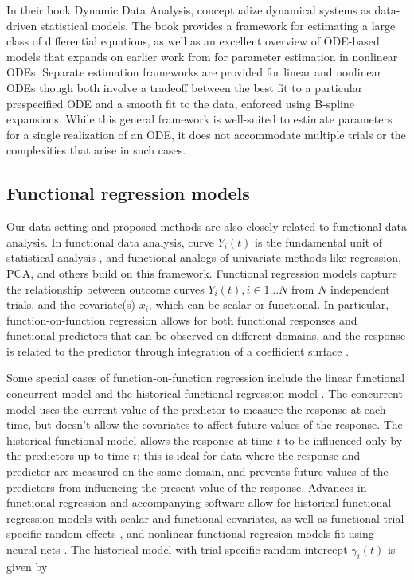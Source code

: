 \documentclass[preprint]{JASA}
\begin{document}
In their book Dynamic Data Analysis, \cite{ramsay2017} conceptualize
dynamical systems as data-driven statistical models. The book provides a
framework for estimating a large class of differential equations, as
well as an excellent overview of ODE-based models that expands on
earlier work from \cite{ramsay2007} for parameter estimation in
nonlinear ODEs. Separate estimation frameworks are provided for linear
and nonlinear ODEs though both involve a tradeoff between the best fit
to a particular prespecified ODE and a smooth fit to the data, enforced
using B-spline expansions. While this general framework is well-suited
to estimate parameters for a single realization of an ODE, it does not
accommodate multiple trials or the complexities that arise in such
cases.

\hypertarget{functional-regression-models}{%
\subsection{Functional regression
models}\label{functional-regression-models}}

\label{sec:fda}

Our data setting and proposed methods are also closely related to
functional data analysis. In functional data analysis, curve \(Y_i(t)\)
is the fundamental unit of statistical analysis \citep{ramsay2005}, and
functional analogs of univariate methods like regression, PCA, and
others build on this framework. Functional regression models capture the
relationship between outcome curves \(Y_i(t), i \in 1 \ldots N\) from
\(N\) independent trials, and the covariate(s) \(x_i\), which can be
scalar or functional. In particular, function-on-function regression
allows for both functional responses and functional predictors that can
be observed on different domains, and the response is related to the
predictor through integration of a coefficient surface
\citep{ramsay2005}.

Some special cases of function-on-function regression include the linear
functional concurrent model \citep{fan2008, goldsmith2017} and the
historical functional regression model \citep{malfait2003, leroux2018}.
The concurrent model uses the current value of the predictor to measure
the response at each time, but doesn't allow the covariates to affect
future values of the response. The historical functional model allows
the response at time \(t\) to be influenced only by the predictors up to
time \(t\); this is ideal for data where the response and predictor are
measured on the same domain, and prevents future values of the
predictors from influencing the present value of the response. Advances
in functional regression and accompanying software allow for historical
functional regression models with scalar and functional covariates, as
well as functional trial-specific random effects
\citep{scheipl2015, scheipl2016, refund}, and nonlinear functional
regresion models fit using neural nets \citep{rao2021}. The historical
model with trial-specific random intercept \(\gamma_i(t)\) is given by
\end{document}
